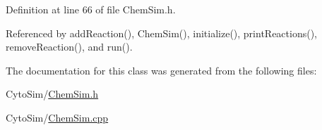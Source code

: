 Definition at line 66 of file Chem\-Sim.\-h.



Referenced by add\-Reaction(), Chem\-Sim(), initialize(), print\-Reactions(), remove\-Reaction(), and run().



The documentation for this class was generated from the following files\-:\begin{DoxyCompactItemize}
\item 
Cyto\-Sim/\hyperlink{ChemSim_8h}{Chem\-Sim.\-h}\item 
Cyto\-Sim/\hyperlink{ChemSim_8cpp}{Chem\-Sim.\-cpp}\end{DoxyCompactItemize}
